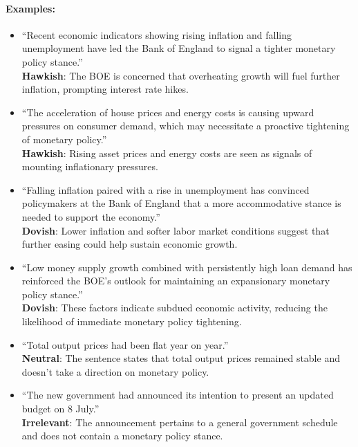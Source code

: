 \paragraph{Examples: }
\begin{itemize}
    \item ``Recent economic indicators showing rising inflation and falling unemployment have led the Bank of England to signal a tighter monetary policy stance.''\\
    \textbf{Hawkish}: The BOE is concerned that overheating growth will fuel further inflation, prompting interest rate hikes.
    
    \item ``The acceleration of house prices and energy costs is causing upward pressures on consumer demand, which may necessitate a proactive tightening of monetary policy.''\\
    \textbf{Hawkish}: Rising asset prices and energy costs are seen as signals of mounting inflationary pressures.
    
    \item ``Falling inflation paired with a rise in unemployment has convinced policymakers at the Bank of England that a more accommodative stance is needed to support the economy.''\\
    \textbf{Dovish}: Lower inflation and softer labor market conditions suggest that further easing could help sustain economic growth.
    
    \item ``Low money supply growth combined with persistently high loan demand has reinforced the BOE's outlook for maintaining an expansionary monetary policy stance.''\\
    \textbf{Dovish}: These factors indicate subdued economic activity, reducing the likelihood of immediate monetary policy tightening.

    \item ``Total output prices had been flat year on year.''\\
    \textbf{Neutral}: The sentence states that total output prices remained stable and doesn't take a direction on monetary policy.
    
    \item ``The new government had announced its intention to present an updated budget on 8 July.''\\
    \textbf{Irrelevant}: The announcement pertains to a general government schedule and does not contain a monetary policy stance.
\end{itemize}

